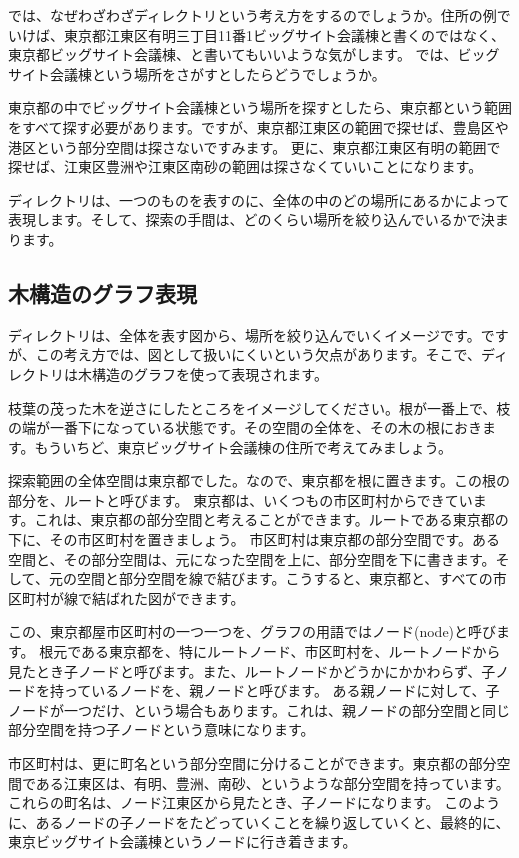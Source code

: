 では、なぜわざわざディレクトリという考え方をするのでしょうか。住所の例でいけば、東京都江東区有明三丁目11番1ビッグサイト会議棟と書くのではなく、東京都ビッグサイト会議棟、と書いてもいいような気がします。
では、ビッグサイト会議棟という場所をさがすとしたらどうでしょうか。

東京都の中でビッグサイト会議棟という場所を探すとしたら、東京都という範囲をすべて探す必要があります。ですが、東京都江東区の範囲で探せば、豊島区や港区という部分空間は探さないですみます。
更に、東京都江東区有明の範囲で探せば、江東区豊洲や江東区南砂の範囲は探さなくていいことになります。

ディレクトリは、一つのものを表すのに、全体の中のどの場所にあるかによって表現します。そして、探索の手間は、どのくらい場所を絞り込んでいるかで決まります。


\subsection{木構造のグラフ表現}

ディレクトリは、全体を表す図から、場所を絞り込んでいくイメージです。ですが、この考え方では、図として扱いにくいという欠点があります。そこで、ディレクトリは木構造のグラフを使って表現されます。

枝葉の茂った木を逆さにしたところをイメージしてください。根が一番上で、枝の端が一番下になっている状態です。その空間の全体を、その木の根におきます。もういちど、東京ビッグサイト会議棟の住所で考えてみましょう。

探索範囲の全体空間は東京都でした。なので、東京都を根に置きます。この根の部分を、ルートと呼びます。
東京都は、いくつもの市区町村からできています。これは、東京都の部分空間と考えることができます。ルートである東京都の下に、その市区町村を置きましょう。
市区町村は東京都の部分空間です。ある空間と、その部分空間は、元になった空間を上に、部分空間を下に書きます。そして、元の空間と部分空間を線で結びます。こうすると、東京都と、すべての市区町村が線で結ばれた図ができます。

この、東京都屋市区町村の一つ一つを、グラフの用語ではノード(node)と呼びます。
根元である東京都を、特にルートノード、市区町村を、ルートノードから見たとき子ノードと呼びます。また、ルートノードかどうかにかかわらず、子ノードを持っているノードを、親ノードと呼びます。
ある親ノードに対して、子ノードが一つだけ、という場合もあります。これは、親ノードの部分空間と同じ部分空間を持つ子ノードという意味になります。

市区町村は、更に町名という部分空間に分けることができます。東京都の部分空間である江東区は、有明、豊洲、南砂、というような部分空間を持っています。これらの町名は、ノード江東区から見たとき、子ノードになります。
このように、あるノードの子ノードをたどっていくことを繰り返していくと、最終的に、東京ビッグサイト会議棟というノードに行き着きます。

